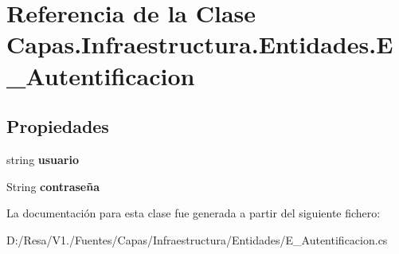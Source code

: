 \section{Referencia de la Clase Capas.\+Infraestructura.\+Entidades.\+E\+\_\+\+Autentificacion}
\label{class_capas_1_1_infraestructura_1_1_entidades_1_1_e___autentificacion}
\subsection*{Propiedades}
\begin{DoxyCompactItemize}
\item 
string {\bfseries usuario}\hspace{0.3cm}{\ttfamily  [get, set]}\label{class_capas_1_1_infraestructura_1_1_entidades_1_1_e___autentificacion_ac9c12f0ae6afe62697104b2ebf458928}

\item 
String {\bfseries contraseña}\hspace{0.3cm}{\ttfamily  [get, set]}\label{class_capas_1_1_infraestructura_1_1_entidades_1_1_e___autentificacion_a0fcdc72503b74fa48854932a0af76193}

\end{DoxyCompactItemize}


La documentación para esta clase fue generada a partir del siguiente fichero\+:\begin{DoxyCompactItemize}
\item 
D\+:/\+Resa/\+V1./\+Fuentes/\+Capas/\+Infraestructura/\+Entidades/E\+\_\+\+Autentificacion.\+cs\end{DoxyCompactItemize}
